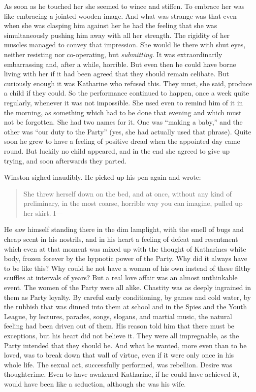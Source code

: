 As soon as he touched her she seemed to wince and stiffen. To embrace
her was like embracing a jointed wooden image. And what was strange was
that even when she was clasping him against her he had the feeling that
she was simultaneously pushing him away with all her strength. The
rigidity of her muscles managed to convey that impression. She would lie
there with shut eyes, neither resisting nor co-operating, but
\emph{submitting}. It was extraordinarily embarrassing and, after a
while, horrible. But even then he could have borne living with her if it
had been agreed that they should remain celibate. But curiously enough
it was Katharine who refused this. They must, she said, produce a child
if they could. So the performance continued to happen, once a week quite
regularly, whenever it was not impossible. She used even to remind him
of it in the morning, as something which had to be done that evening and
which must not be forgotten. She had two names for it. One was ``making a
baby,'' and the other was ``our duty to the Party'' (yes, she had actually
used that phrase). Quite soon he grew to have a feeling of positive
dread when the appointed day came round. But luckily no child appeared,
and in the end she agreed to give up trying, and soon afterwards they
parted.

Winston sighed inaudibly. He picked up his pen again and wrote:

\begin{quotation}
She threw herself down on the bed, and at once, without any kind
of preliminary, in the most coarse, horrible way you can imagine, pulled
up her skirt. I---
\end{quotation}

He saw himself standing there in the dim lamplight, with the smell of
bugs and cheap scent in his nostrils, and in his heart a feeling of
defeat and resentment which even at that moment was mixed up with the
thought of Katharine\textquotesingle s white body, frozen forever by the
hypnotic power of the Party. Why did it always have to be like this? Why
could he not have a woman of his own instead of these filthy scuffles at
intervals of years? But a real love affair was an almost unthinkable
event. The women of the Party were all alike. Chastity was as deeply
ingrained in them as Party loyalty. By careful early conditioning, by
games and cold water, by the rubbish that was dinned into them at school
and in the Spies and the Youth League, by lectures, parades, songs,
slogans, and martial music, the natural feeling had been driven out of
them. His reason told him that there must be exceptions, but his heart
did not believe it. They were all impregnable, as the Party intended
that they should be. And what he wanted, more even than to be loved, was
to break down that wall of virtue, even if it were only once in his
whole life. The sexual act, successfully performed, was rebellion.
Desire was thoughtcrime. Even to have awakened Katharine, if he could
have achieved it, would have been like a seduction, although she was his
wife.

